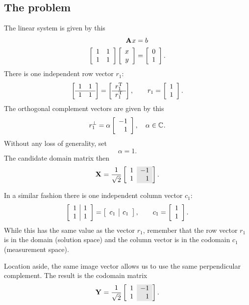 \subsection{The problem}
The linear system is given by this
\begin{equation}
  \begin{split}
    \lsa\\
    \mat{cc}{1&1\\1&1}\mat{c}{x\\y} &= \mat{c}{0\\1}.
  \end{split}
\end{equation}There is one independent row vector $r_{1}$:
\begin{equation}
  \mat{cc}{1&1\\\hline1&1} = \mat{c}{r_{1}^{\mathrm{T}}\\\hline r_{1}^{\mathrm{T}}}, \qquad r_{1}=\mat{c}{1\\1}.
\end{equation}
The orthogonal complement vectors are given by this
\begin{equation}
  r_{1}^{\perp} = \alpha\mat{r}{-1\\1}, \quad \alpha \in \cmplx{}.
\end{equation}
Without any loss of generality, set
\begin{equation}
  \alpha = 1.
\end{equation}
The candidate domain matrix then
\begin{equation}
  \X{} = 
\stwo
\left[
\begin{array}{r >{\columncolor{ltgray}}r}
  1 & -1 \\
  1 &  1
\end{array}
\right]
.
\end{equation}

In a similar fashion there is one independent column vector $c_{1}$:
\begin{equation}
  \mat{c|c}{1&1\\1&1} = \mat{c|c}{c_{1}&c_{1}}, \qquad c_{1}=\mat{c}{1\\1}.
\end{equation}
While this has the same value as the vector $r_{1}$, remember that the row vector $r_{1}$ is in the domain (solution space) and the column vector is in the codomain $c_{1}$ (measurement space).

Location aside, the same image vector allows us to use the same perpendicular complement. The result is the codomain matrix
\begin{equation}
  \Y{} = 
\stwo
\left[
\begin{array}{r >{\columncolor{ltgray}}r}
  1 & -1 \\
  1 &  1
\end{array}
\right]
.
\end{equation}


